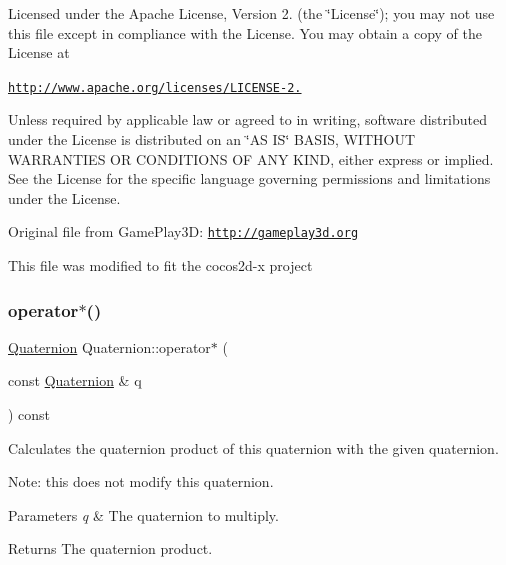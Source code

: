 Licensed under the Apache License, Version 2. (the \char`\"{}\+License\char`\"{}); you may not use this file except in compliance with the License. You may obtain a copy of the License at

\href{http://www.apache.org/licenses/LICENSE-2.0}{\tt http\+://www.\+apache.\+org/licenses/\+L\+I\+C\+E\+N\+S\+E-\/2.}

Unless required by applicable law or agreed to in writing, software distributed under the License is distributed on an \char`\"{}\+A\+S I\+S\char`\"{} B\+A\+S\+IS, W\+I\+T\+H\+O\+UT W\+A\+R\+R\+A\+N\+T\+I\+ES OR C\+O\+N\+D\+I\+T\+I\+O\+NS OF A\+NY K\+I\+ND, either express or implied. See the License for the specific language governing permissions and limitations under the License.

Original file from Game\+Play3D\+: \href{http://gameplay3d.org}{\tt http\+://gameplay3d.\+org}

This file was modified to fit the cocos2d-\/x project \mbox{\label{classQuaternion_ab178e12364d87fb676d85695e491361f}} 
\subsubsection{\texorpdfstring{operator$\ast$()}{operator*()}\hspace{0.1cm}{\footnotesize\ttfamily [2/4]}}
{\footnotesize\ttfamily \hyperlink{classQuaternion}{Quaternion} Quaternion\+::operator$\ast$ (\begin{DoxyParamCaption}\item[{const \hyperlink{classQuaternion}{Quaternion} \&}]{q }\end{DoxyParamCaption}) const\hspace{0.3cm}{\ttfamily [inline]}}

Calculates the quaternion product of this quaternion with the given quaternion.

Note\+: this does not modify this quaternion.


\begin{DoxyParams}{Parameters}
{\em q} & The quaternion to multiply. \\
\hline
\end{DoxyParams}
\begin{DoxyReturn}{Returns}
The quaternion product. 
\end{DoxyReturn}
\mbox{\label{classQuaternion_a8b63a645c77ec58d1caa6ccb80f51c3b}} 
